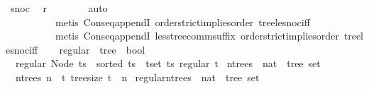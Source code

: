 \begin{isabellebody}
\ snoc\ \isamarkupfalse%
\ r\isanewline
\ \ \ \ \ \ \isamarkupfalse%
\ {\isacharparenleft}{\kern0pt}auto{\isacharcomma}{\kern0pt}\isanewline
\ \ \ \ \ \ \ \ \ \ metis\ Cons{\isacharunderscore}{\kern0pt}eq{\isacharunderscore}{\kern0pt}appendI\ order{\isachardot}{\kern0pt}strict{\isacharunderscore}{\kern0pt}implies{\isacharunderscore}{\kern0pt}order\ tree{\isacharunderscore}{\kern0pt}le{\isacharunderscore}{\kern0pt}snoc{}{\isacharunderscore}{\kern0pt}iff{\isacharcomma}{\kern0pt}\isanewline
\ \ \ \ \ \ \ \ \ \ metis\ Cons{\isacharunderscore}{\kern0pt}eq{\isacharunderscore}{\kern0pt}appendI\ less{\isacharunderscore}{\kern0pt}tree{\isacharunderscore}{\kern0pt}comm{\isacharunderscore}{\kern0pt}suffix\ order{\isachardot}{\kern0pt}strict{\isacharunderscore}{\kern0pt}implies{\isacharunderscore}{\kern0pt}order\ tree{\isacharunderscore}{\kern0pt}le{\isacharunderscore}{\kern0pt}snoc{}{\isacharunderscore}{\kern0pt}iff{\isacharparenright}{\kern0pt}\isanewline
\ \ \isamarkupfalse%
\isanewline
{}\isamarkupfalse%
%
\endisatagproof
{\isafoldproof}%
%
\isadelimproof
\isanewline
%
\endisadelimproof
\isanewline
\isanewline
{}\isamarkupfalse%
\ regular\ {\isacharcolon}{\kern0pt}{\isacharcolon}{\kern0pt}\ {\isachardoublequoteopen}tree\ {\isasymRightarrow}\ bool{\isachardoublequoteclose}\ \isanewline
\ \ {\isachardoublequoteopen}regular\ {\isacharparenleft}{\kern0pt}Node\ ts{\isacharparenright}{\kern0pt}\ {\isasymlongleftrightarrow}\ sorted\ ts\ {\isasymand}\ {\isacharparenleft}{\kern0pt}{\isasymforall}t{\isasymin}set\ ts{\isachardot}{\kern0pt}\ regular\ t{\isacharparenright}{\kern0pt}{\isachardoublequoteclose}\isanewline
\isanewline
{}\isamarkupfalse%
\ n{\isacharunderscore}{\kern0pt}trees\ {\isacharcolon}{\kern0pt}{\isacharcolon}{\kern0pt}\ {\isachardoublequoteopen}nat\ {\isasymRightarrow}\ tree\ set{\isachardoublequoteclose}\ \isanewline
\ \ {\isachardoublequoteopen}n{\isacharunderscore}{\kern0pt}trees\ n\ {\isacharequal}{\kern0pt}\ {\isacharbraceleft}{\kern0pt}t{\isachardot}{\kern0pt}\ tree{\isacharunderscore}{\kern0pt}size\ t\ {\isacharequal}{\kern0pt}\ n{\isacharbraceright}{\kern0pt}{\isachardoublequoteclose}\isanewline
\isanewline
{}\isamarkupfalse%
\ regular{\isacharunderscore}{\kern0pt}n{\isacharunderscore}{\kern0pt}trees\ {\isacharcolon}{\kern0pt}{\isacharcolon}{\kern0pt}\ {\isachardoublequoteopen}nat\ {\isasymRightarrow}\ tree\ set{\isachardoublequoteclose}\ \isanewline

\end{isabellebody}
